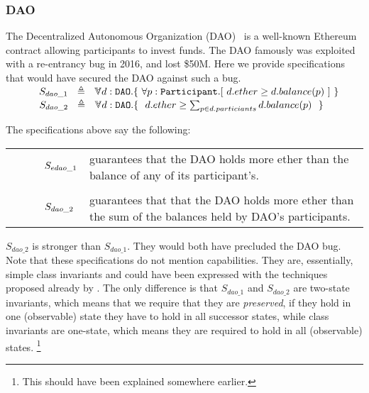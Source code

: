 \subsubsection{DAO}
The Decentralized Autonomous Organization (DAO)~\cite{Dao}  is a well-known Ethereum contract allowing 
participants to invest funds. The DAO famously was exploited with a re-entrancy bug in 2016, 
and lost \$50M. Here we provide specifications that would have secured the DAO against such a 
bug. 
\\ 
$\strut \SPSP  S_{dao\_1}\ \  \triangleq \ \ \TwoStatesN{ d:\prg{DAO}}{\ \forall p:\prg{Participant}. [\ d.ether \geq d.balance(p) \ ]   \ }$ 
\\
$\strut \SPSP  S_{dao\_2}\ \  \triangleq \ \ \TwoStatesN{ d:\prg{DAO}}{\ \ d.ether \geq \sum_{p \in d.particiants} d.balance(p)\  \ }$ 


The specifications above say the following:
\\
\begin{tabular}{ll}
\begin{minipage}{.10\textwidth}
$\strut \ \ \ \ \ \ \ \ \ \   S_{edao\_1}$
\end{minipage}
&
\begin{minipage}{.85\textwidth}
guarantees that the DAO holds more ether than the balance  of any of its  participant's.
\end{minipage}
\\
\\
\begin{minipage}{.10\textwidth}
$\strut \ \ \ \ \ \ \ \ \ \   S_{dao\_2}$ 
\end{minipage}
&
\begin{minipage}{.85\textwidth}
guarantees that that the DAO holds more ether than the sum  of the balances held by DAO's participants.
\end{minipage}
\end{tabular}

$S_{dao\_2}$  is stronger than $S_{dao\_1}$. They would both have precluded the DAO bug. Note that these specifications  do not mention capabilities. 
They are, essentially, simple class invariants and could have been expressed with the techniques proposed already by \cite{MeyerDBC92}.
The only difference is that $S_{dao\_1}$ and $S_{dao\_2}$ are two-state invariants, which means that we require that they are \emph{preserved},
\ie if they hold in one (observable) state they have to hold in all successor states,
while class invariants are one-state, which means they are required to hold in all (observable) states.
\footnote{This should have been explained somewhere earlier.}

